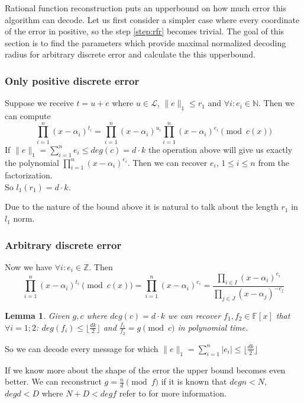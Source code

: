 \documentclass[12pt]{article}
\newcommand{\floor}[1]{\lfloor #1 \rfloor}
\newtheorem{lemma}{Lemma}
\begin{document}
Rational function reconstruction puts an upperbound on how much error this algorithm can decode. Let us first consider a simpler case where every coordinate of the error in positive, so the step \ref{step:rfr} becomes trivial. The goal of this section is to find the parameters which provide maximal normalized decoding radius for arbitrary discrete error and calculate the this upperbound.

\subsubsection{Only positive discrete error}
\label{subsubsec:positive_error}
Suppose we receive $t = u + e$ where $u \in \mathcal{L}$, $\|e\|_1 \leq r_1$ and $\forall i: e_i \in \mathbb{N}$. Then we can compute
\[
\prod_{i = 1}^{n}(x - \alpha_i)^{t_i} = \prod_{i = 1}^{n}(x - \alpha_i)^{u_i}\prod_{i = 1}^{n}(x - \alpha_i)^{e_i} \pmod{c(x)}
\]
If $\|e\|_1 = \sum_{i =1}^{n} e_i \leq deg(c) = d \cdot k$ the operation above will give us exactly the polynomial $\prod_{i = 1}^{n}(x - \alpha_i)^{e_i}$. Then we can recover $e_i$, $1 \leq i \leq n$ from the factorization.\\
So $l_1(r_1) = d \cdot k$.

Due to the nature of the bound above it is natural to talk about the length $r_1$ in $l_1$ norm.


\subsubsection{Arbitrary discrete error}
\label{subsubsec:discrete_error}
Now we have $\forall i: e_i \in \mathbb{Z}$. Then
\[
\prod_{i = 1}^{n}(x - \alpha_i)^{t_i} \pmod{c(x)} = \prod_{i = 1}^{n}(x - \alpha_i)^{e_i} = \frac{\prod_{i \in I}(x - \alpha_i)^{e_i}}{\prod_{j \in J}(x - \alpha_j)^{-e_j}}
\]

\begin{lemma}
Given $g,c$ where $deg(c) = d \cdot k$ we can recover $f_{1}, f_{2} \in \mathbb{F}[x]$ that  $\forall i = 1;2$: $deg(f_{i}) \leq \floor{\frac{dk}{2}}$ and $\frac{f_{1}}{f_{2}} = g \pmod{c}$ in polynomial time.
\end{lemma}

So we can decode every message for which $\|e\|_1 = \sum_{i =1}^{n} |e_i| \leq \floor{\frac{dk}{2}}$

If we know more about the shape of the error the upper bound becomes even better. We can reconstruct $g = \frac{n}{d} \pmod{f}$ if it is known that $deg n < N$, $deg d < D$ where $N + D < deg f$ refer to \cite{[KM06]} for more information.
\end{document}
